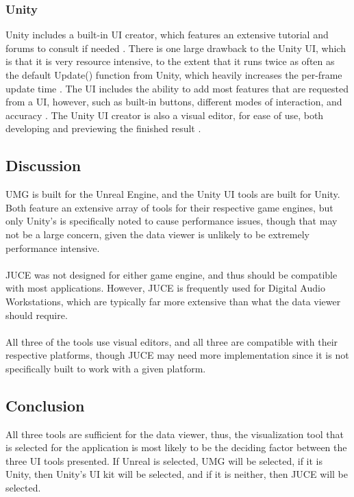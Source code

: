 \documentclass[onecolumn, draftclsnofoot,10pt, compsoc]{IEEEtran}
\begin{document}
\subsubsection{Unity}
Unity includes a built-in UI creator, which features an extensive tutorial and forums to consult if needed \cite{3}. There is one large drawback to the Unity UI, which is that it is very resource intensive, to the extent that it runs twice as often as the default Update() function from Unity, which heavily increases the per-frame update time \cite{4}. The UI includes the ability to add most features that are requested from a UI, however, such as built-in buttons, different modes of interaction, and accuracy \cite{3}. The Unity UI creator is also a visual editor, for ease of use, both developing and previewing the finished result \cite{3}.

\subsection{Discussion}
UMG is built for the Unreal Engine, and the Unity UI tools are built for Unity. Both feature an extensive array of tools for their respective game engines, but only Unity's is specifically noted to cause performance issues, though that may not be a large concern, given the data viewer is unlikely to be extremely performance intensive. 
\\
\\
JUCE was not designed for either game engine, and thus should be compatible with most applications. However, JUCE is frequently used for Digital Audio Workstations, which are typically far more extensive than what the data viewer should require. 
\\
\\
All three of the tools use visual editors, and all three are compatible with their respective platforms, though JUCE may need more implementation since it is not specifically built to work with a given platform.

\subsection{Conclusion}
All three tools are sufficient for the data viewer, thus, the visualization tool that is selected for the application is most likely to be the deciding factor between the three UI tools presented. If Unreal is selected, UMG will be selected, if it is Unity, then Unity's UI kit will be selected, and if it is neither, then JUCE will be selected.
\end{document}
